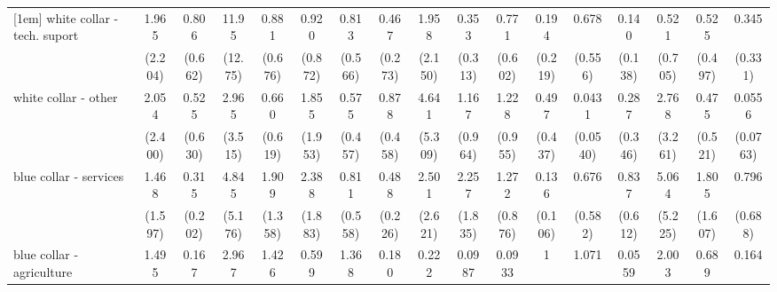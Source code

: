 {\begin{tabular}{l*{16}{c}}
[1em]
white collar - tech. suport&       1.965         &       0.806         &       11.95\sym{*}  &       0.881         &       0.920         &       0.813         &       0.467         &       1.958         &       0.353         &       0.771         &       0.194         &       0.678         &       0.140\sym{*}  &       0.521         &       0.525         &       0.345         \\
                    &     (2.204)         &     (0.662)         &     (12.75)         &     (0.676)         &     (0.872)         &     (0.566)         &     (0.273)         &     (2.150)         &     (0.313)         &     (0.602)         &     (0.219)         &     (0.556)         &     (0.138)         &     (0.705)         &     (0.497)         &     (0.331)         \\
[1em]
white collar - other&       2.054         &       0.525         &       2.965         &       0.660         &       1.855         &       0.575         &       0.878         &       4.641         &       1.167         &       1.228         &       0.497         &      0.0431\sym{*}  &       0.287         &       2.768         &       0.475         &      0.0556\sym{*}  \\
                    &     (2.400)         &     (0.630)         &     (3.515)         &     (0.619)         &     (1.953)         &     (0.457)         &     (0.458)         &     (5.309)         &     (0.964)         &     (0.955)         &     (0.437)         &    (0.0540)         &     (0.346)         &     (3.261)         &     (0.521)         &    (0.0763)         \\
[1em]
blue collar - services&       1.468         &       0.315         &       4.845         &       1.909         &       2.388         &       0.811         &       0.488         &       2.501         &       2.257         &       1.272         &       0.136\sym{*}  &       0.676         &       0.837         &       5.064         &       1.805         &       0.796         \\
                    &     (1.597)         &     (0.202)         &     (5.176)         &     (1.358)         &     (1.883)         &     (0.558)         &     (0.226)         &     (2.621)         &     (1.835)         &     (0.876)         &     (0.106)         &     (0.582)         &     (0.612)         &     (5.225)         &     (1.607)         &     (0.688)         \\
[1em]
blue collar - agriculture&       1.495         &       0.167         &       2.967         &       1.426         &       0.599         &       1.368         &       0.180\sym{*}  &       0.222         &      0.0987         &      0.0933\sym{*}  &           1         &       1.071         &      0.0559\sym{*}  &       2.003         &       0.689         &       0.164         \\

\end{tabular}}
